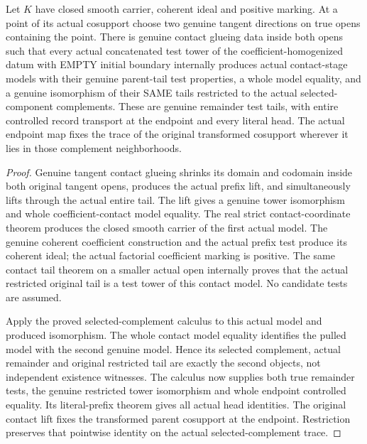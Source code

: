 \begin{theorem}
\label{hir:zero-contact-tail-contact-producer}
\leanok
{}
Let $K$ have closed smooth carrier, coherent ideal and positive marking.
At a point of its actual cosupport choose two genuine tangent directions
on true opens containing the point. There is genuine contact glueing data
inside both opens such that every actual concatenated test tower of the
coefficient-homogenized datum with EMPTY initial boundary internally
produces actual contact-stage models with their genuine parent-tail test properties, a whole model equality, and a genuine
isomorphism of their SAME tails restricted to the actual selected-component
complements. These are genuine remainder test tails, with entire controlled
record transport at the endpoint and every literal head. The actual endpoint
map fixes the trace of the original transformed cosupport wherever it lies
in those complement neighborhoods.
\end{theorem}
\begin{proof}
Genuine tangent contact glueing shrinks its domain and codomain inside both
original tangent opens, produces the actual prefix lift, and simultaneously
lifts through the actual entire tail. The lift gives a genuine tower
isomorphism and whole coefficient-contact model equality. The real strict
contact-coordinate theorem produces the closed smooth carrier of the first
actual model. The genuine coherent coefficient construction and the actual
prefix test produce its coherent ideal; the actual factorial coefficient
marking is positive. The same contact tail theorem on a smaller actual open
internally proves that the actual restricted original tail is a test tower
of this contact model. No candidate tests are assumed.

Apply the proved selected-complement calculus to this actual model and
produced isomorphism. The whole contact model equality identifies the pulled
model with the second genuine model. Hence its selected complement, actual
remainder and original restricted tail are exactly the second objects,
not independent existence witnesses. The calculus now supplies both true
remainder tests, the genuine restricted tower isomorphism and whole endpoint
controlled equality. Its literal-prefix theorem gives all actual head
identities. The original contact lift fixes the transformed parent
cosupport at the endpoint. Restriction preserves that pointwise identity
on the actual selected-complement trace.
\end{proof}

